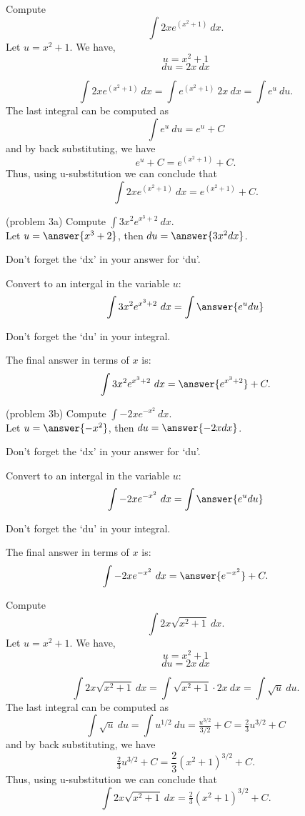 \documentclass{ximera}
\begin{document}
\begin{example}[example 3] Compute 
\[\int 2xe^{(x^2 + 1)} \ dx.\]
Let $u = x^2 + 1$.  We have,
\[u = x^2 + 1\]
\[du = 2x \ dx\]

\[\int 2xe^{(x^2 + 1)} \ dx = \int e^{(x^2 + 1)} \ 2x\  dx = \int e^u \ du.\]
The last integral can be computed as 
\[\int e^u \ du = e^u + C\]
and by back substituting, we have 
\[e^u + C = e^{(x^2 + 1)} + C.\]
Thus, using u-substitution we can conclude that
\[\int 2xe^{(x^2 + 1)} \ dx =  e^{(x^2 + 1)} + C.\]
\end{example}

\begin{problem}(problem 3a) Compute $\displaystyle{\int 3x^2e^{x^3 + 2} \ dx}$.\\
Let $u = \answer{x^3 + 2}$, then $du = \answer{3x^2 dx}$.\\
\begin{hint}
Don't forget the `dx' in your answer for `du'.
\end{hint}
Convert to an intergal in the variable $u$:
\[\int 3x^2e^{x^3 + 2} \ dx = \int\answer{e^u du}\]
\begin{hint}
Don't forget the `du' in your integral.
\end{hint}
The final answer in terms of $x$ is:
\[\int 3x^2e^{x^3 + 2} \ dx = \answer{e^{x^3 + 2}} +C.\]
\end{problem}

\begin{problem}(problem 3b) Compute $\displaystyle{\int -2xe^{-x^2} \ dx}$.\\
Let $u = \answer{-x^2}$, then $du = \answer{-2x dx}$.\\
\begin{hint}
Don't forget the `dx' in your answer for `du'.
\end{hint}
Convert to an intergal in the variable $u$:
\[\int -2xe^{-x^2} \ dx = \int\answer{e^u du}\]
\begin{hint}
Don't forget the `du' in your integral.
\end{hint}
The final answer in terms of $x$ is:
\[\int -2xe^{-x^2} \ dx = \answer{e^{-x^2}} +C.\]
\end{problem}

\begin{example}[example 4] Compute 
\[\int 2x\sqrt{x^2 + 1} \ dx.\]
Let $u = x^2 + 1$.  We have,
\[u = x^2 + 1\]
\[du = 2x \ dx\]

\[\int 2x\sqrt{x^2 + 1} \ dx = \int \sqrt{x^2 + 1} \cdot 2x\  dx = \int \sqrt{u} \ du.\]
The last integral can be computed as 
\[\int \sqrt u  \ du = \int u^{1/2} \ du = \tfrac{u^{3/2}}{3/2} + C = \tfrac23 u^{3/2} + C\]
and by back substituting, we have 
\[\tfrac23 u^{3/2}  + C = \frac23 (x^2 + 1)^{3/2} + C.\]
Thus, using u-substitution we can conclude that
\[\int 2x\sqrt{x^2 + 1} \ dx =  \tfrac23 (x^2 + 1)^{3/2} + C.\]
\end{example}
\end{document}
